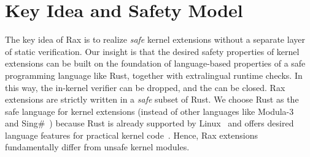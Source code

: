 \section{Key Idea and Safety Model}
\label{sec:safety_model}
\vspace{-5pt}

The key idea of Rax is to realize {\it safe} kernel extensions without a separate layer of
    static verification.
Our insight is that the desired safety properties of kernel extensions
    can be built on the foundation of language-based properties of
    a safe programming language like Rust,
    together with extralingual runtime checks.
In this way, the in-kernel verifier can be dropped, and
    the \gap{} can be closed.
Rax extensions are strictly written in a {\it safe} subset of Rust.
We choose Rust as the safe language for kernel extensions
    (instead of other languages like Modula-3~\cite{spin}
    and Sing\#~\cite{lang-sing})
    because Rust is already supported
    by Linux~\cite{rust-for-linux-lwn} and offers
    desired language features for practical kernel code~\cite{redleaf,theseus,tockos}.
Hence, Rax extensions fundamentally differ from unsafe kernel modules.

